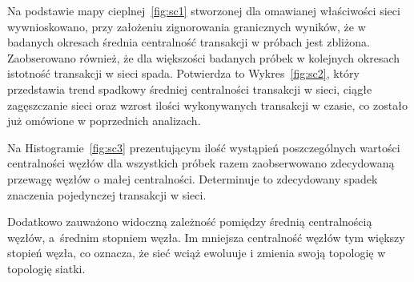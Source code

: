 \documentclass[12pt, oneside, final, openany]{mgr}
\begin{document}
\indent Na podstawie mapy cieplnej~\ref{fig:sc1} stworzonej dla omawianej właściwości sieci wywnioskowano, przy założeniu zignorowania granicznych wyników, że w badanych okresach średnia centralność transakcji w próbach jest zbliżona. Zaobserowano również, że dla większości badanych próbek w kolejnych okresach istotność transakcji w sieci spada. Potwierdza to Wykres~\ref{fig:sc2}, który przedstawia trend spadkowy średniej centralności transakcji w sieci, ciągłe zagęszczanie sieci oraz wzrost ilości wykonywanych transakcji w czasie, co zostało już omówione w poprzednich analizach.

\indent Na Histogramie~\ref{fig:sc3} prezentującym ilość wystąpień poszczególnych wartości centralności węzłów dla wszystkich próbek razem zaobserwowano zdecydowaną przewagę węzłów o małej centralności. Determinuje to zdecydowany spadek znaczenia pojedynczej transakcji w sieci.

\indent Dodatkowo zauważono widoczną zależność pomiędzy średnią centralnością węzłów, a~średnim stopniem węzła. Im mniejsza centralność węzłów tym większy stopień węzła, co oznacza, że sieć wciąż ewoluuje i zmienia swoją topologię w topologię siatki. 
\end{document}
